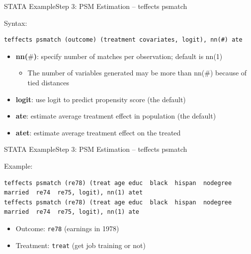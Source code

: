 \documentclass[hyperref={pdfpagelabels=false}]{beamer}
\begin{document}
\begin{frame}[fragile]{STATA Example}{Step 3: PSM Estimation -- teffects psmatch}
	\item Syntax:
\begin{lstlisting}
teffects psmatch (outcome) (treatment covariates, logit), nn(#) ate
\end{lstlisting}
	\begin{itemize}
		\vspace{0.2cm}
		\item \textbf{nn($\#$)}: specify number of matches per observation; default is nn(1)
		\vspace{0.2cm}
			\begin{itemize}
		\item The number of variables generated may be more than nn($\#$) because of tied distances
			\end{itemize}
		\vspace{0.2cm}
		\item \textbf{logit}: use logit to predict propensity score (the default)
		\vspace{0.2cm}
		\item \textbf{ate}: estimate average treatment effect in population (the default)
		\vspace{0.2cm}
		\item \textbf{atet}: estimate average treatment effect on the treated  
		
	\end{itemize}
\end{frame}




\begin{frame}[fragile]{STATA Example}{Step 3: PSM Estimation -- teffects psmatch}
	\item Example:
\begin{lstlisting}
teffects psmatch (re78) (treat age educ  black  hispan  nodegree  married  re74  re75, logit), nn(1) atet
teffects psmatch (re78) (treat age educ  black  hispan  nodegree  married  re74  re75, logit), nn(1) ate
\end{lstlisting}
	\begin{itemize}
		\vspace{0.2cm}
		\item Outcome: \texttt{re78} (earnings in 1978)
		\vspace{0.2cm}
		\item Treatment: \texttt{treat} (get job training or not)
	\end{itemize}
\end{frame}
\end{document}
